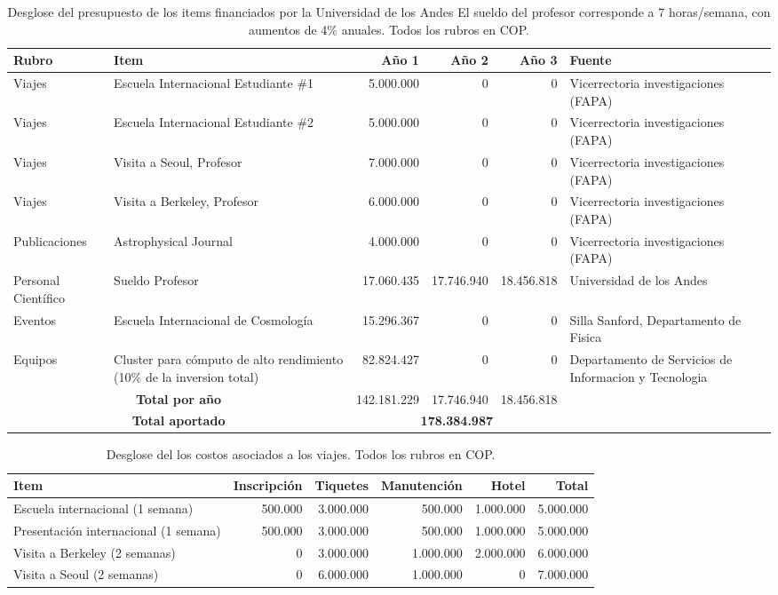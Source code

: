 \begin{table}[h]
\begin{center}
\begin{tabular}{|l|p{3.0cm}|r|r|r|p{2.5cm}|}\hline
{\bf Rubro}	&{\bf Item}	& {\bf Año 1}	& {\bf Año 2}	& {\bf Año 3}	& {\bf Fuente}\\	\hline
Viajes	&Escuela Internacional Estudiante \#1	&5.000.000	&0	&0	&Vicerrectoria investigaciones (FAPA)	\\\hline
Viajes	&Escuela Internacional Estudiante \#2	&5.000.000	&0	&0	&Vicerrectoria investigaciones (FAPA)	\\\hline
Viajes	&Visita a Seoul, Profesor	&7.000.000	&0	&0	&Vicerrectoria investigaciones (FAPA)	\\\hline
Viajes	&Visita a Berkeley, Profesor	&6.000.000	&0	&0	&Vicerrectoria investigaciones (FAPA)	\\\hline
Publicaciones	&Astrophysical Journal	&4.000.000	&0	&0	&Vicerrectoria investigaciones (FAPA)	\\\hline
Personal Científico	&Sueldo Profesor	&17.060.435	&17.746.940	&18.456.818	&Universidad de los Andes\\	\hline
Eventos	&Escuela Internacional de Cosmología	&15.296.367	&0	&0	&Silla Sanford, Departamento de Fisica	\\\hline
Equipos	&Cluster para c\'omputo de alto rendimiento (10\% de la inversion total)	&82.824.427	&0	&0	&Departamento de Servicios de Informacion y Tecnologia\\\hline
\multicolumn{2}{|c|}{{\bf Total por año}}&	142.181.229	&17.746.940	&18.456.818&\\\hline
\multicolumn{2}{|c|}{{\bf Total aportado}}&	 \multicolumn{3}{|c|}{{\bf 178.384.987}}&\\\hline
\end{tabular} 
\caption{Desglose del presupuesto de los items financiados por la Universidad de los Andes
 El sueldo del profesor corresponde a 7 horas/semana, con aumentos de 4\% anuales. Todos los rubros en COP. }
\end{center}
\label{Resumen Presupuesto Colciencias}
\end{table}


\begin{table}[h]
\begin{center}
\begin{tabular}{|p{4.5cm}|r|r|r|r|r|}\hline
{\bf Item}	& {\bf Inscripci\'on}	&{\bf Tiquetes}	&{\bf Manutenci\'on}	&{\bf Hotel}	&{\bf Total}\\\hline
Escuela internacional (1 semana)	&500.000	&3.000.000	&500.000	&1.000.000	&5.000.000\\\hline
Presentación internacional (1 semana)	&500.000	&3.000.000	&500.000	&1.000.000	&5.000.000\\\hline
Visita a Berkeley (2 semanas)	&0	&3.000.000	&1.000.000	&2.000.000	&6.000.000\\\hline
Visita a Seoul (2 semanas)	&0	&6.000.000	&1.000.000	&0	&7.000.000\\\hline
\end{tabular} 
\caption{Desglose del los costos asociados a los viajes.
 Todos los rubros en COP. }
\end{center}
\label{TablaViajes}
\end{table}
